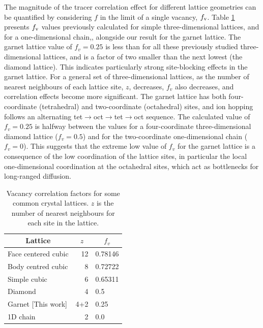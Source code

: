 \documentclass[aps,prb,twocolumn,superscriptaddress,reprint]{revtex4-1}
\begin{document}
The magnitude of the tracer correlation effect for different lattice geometries can be quantified by considering $f$ in the limit of a single vacancy, $f_{\mathrm{v}}$. 
Table \ref{tab:vacancy_correlation_factors} presents $f_{\mathrm{v}}$ values previously calculated for simple three-dimensional lattices,\cite{CompaanAndHaven_TransFaradaySoc1956} and for a one-dimensional chain,\cite{Mehrer_DiffusionBook}, alongside our result for the garnet lattice. 
The garnet lattice value of $f_v=0.25$ is less than for all these previously studied three-dimensional lattices, and is a factor of two smaller than the next lowest (the diamond lattice). This indicates particularly strong site-blocking effects in the garnet lattice.  
For a general set of three-dimensional lattices, as the number of nearest neighbours of each lattice site, $z$, decreases, $f_v$ also decreases, and correlation effects become more significant.\cite{Friauf_JApplPhys1962}
The garnet lattice has both four-coordinate (tetrahedral) and two-coordinate (octahedral) sites, and ion hopping follows an alternating tet$\to$oct$\to$tet$\to$oct sequence. 
The calculated value of $f_v=0.25$ is halfway between the values for a four-coordinate three-dimensional diamond lattice ($f_v=0.5$) and for the two-coordinate one-dimensional chain ($f_v=0$).\cite{Mehrer_DiffusionBook} 
This suggests that the extreme low value of $f_v$ for the garnet lattice is a consequence of the low coordination of the lattice sites, in particular the local one-dimensional coordination at the octahedral sites, which act as bottlenecks for long-ranged diffusion. 

\begin{table}[htb]
   \begin{center}
     \begin{tabular}{lrl} \hline
        \multicolumn{1}{c}{Lattice} & \multicolumn{1}{c}{$z$} & \multicolumn{1}{c}{$f_v$} \\ \hline
        Face centered cubic\cite{CompaanAndHaven_TransFaradaySoc1956} & 12 & 0.78146 \\
        Body centred cubic\cite{CompaanAndHaven_TransFaradaySoc1956} & 8 & 0.72722 \\
        Simple cubic\cite{CompaanAndHaven_TransFaradaySoc1956} & 6 & 0.65311 \\
        Diamond\cite{CompaanAndHaven_TransFaradaySoc1956} & 4 & 0.5 \\
        Garnet [This work] & 4+2 & 0.25 \\ 
        1D chain\cite{Mehrer_DiffusionBook} & 2 & 0.0 \\ \hline
     \end{tabular}
   \caption{\label{tab:vacancy_correlation_factors}Vacancy correlation factors for some common crystal lattices. $z$ is the number of nearest neighbours for each site in the lattice.}
   \end{center}
 \end{table}
\end{document}
